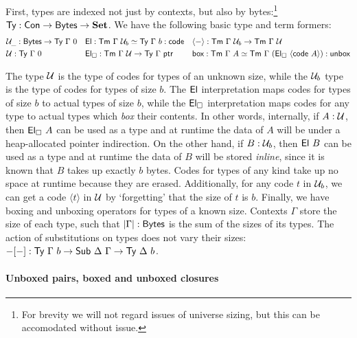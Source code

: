 First, types are indexed not just by contexts, but also by
bytes:\footnote{For brevity we will not regard issues of universe sizing, but this can
be accomodated without issue.} $\textsf{Ty} : \textsf{Con} \to \textsf{Bytes} \to \textbf{Set}$.
We have the following basic type and term formers:
{\small%
\[
\begin{alignedat}{3}
&\univ_{\_} : \Bytes \to \Ty\ \Gamma\ 0 \quad  &&\El : \Tm\ \Gamma\ \univ_b \simeq \Ty\ \Gamma\ b : \code \quad  &&\langle-\rangle : \Tm\ \Gamma\ \univ_b \to \Tm\ \Gamma\ \univ \\
&\univ : \Ty\ \Gamma\ 0 \quad &&\El_\square : \Tm\ \Gamma\ \univ \to \Ty\ \Gamma\ \ptr\quad  && \syn{box} : \Tm\ \Gamma\ A \simeq \Tm\ \Gamma\ (\El_\square\ \langle\code\ A\rangle) : \syn{unbox} \\
\end{alignedat}
\]}

The type \(\mathcal{U}\) is the type of codes for types of an unknown size, while the
\(\mathcal{U}_b\) type is the type of codes for types of size \(b\). The \(\textsf{El}\)
interpretation maps codes for types of size \(b\) to actual types of size \(b\),
while the \(\textsf{El}_\square\) interpretation maps codes for any type to actual types
which \emph{box} their contents. In other words, internally, if \(A : \mathcal{U}\),
then \(\textsf{El}_\square\ A\) can be used as a type and at runtime the data of \(A\)
will be under a heap-allocated pointer indirection. On the other hand, if \(B :
\mathcal{U}_b\), then \(\textsf{El}\ B\) can be used as a type and at runtime the data of
\(B\) will be stored \emph{inline}, since it is known that \(B\) takes up
exactly \(b\) bytes. Codes for types of any kind take up no space at runtime
because they are erased.
Additionally, for any code \(t\) in \(\mathcal{U}_b\), we can get a code
\(\langle t \rangle\) in \(\mathcal{U}\) by `forgetting' that the size
of \(t\) is \(b\). Finally, we have boxing and unboxing operators for types of a known size.
Contexts $\Gamma$ store the size of each type, such that $|\Gamma| : \textsf{Bytes}$ is the sum
of the sizes of its types. The action of
substitutions on types does not vary their sizes: $-[-] : \textsf{Ty}\ \Gamma\ b \to
\textsf{Sub}\ \Delta\ \Gamma \to \textsf{Ty}\ \Delta\ b$.

\paragraph{Unboxed pairs, boxed and unboxed closures}\label{function-types}

